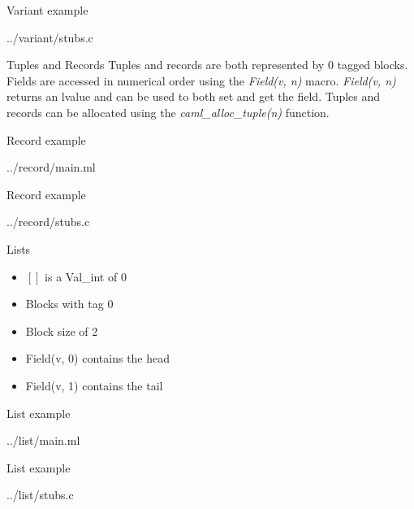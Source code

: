 \documentclass{beamer}
\begin{document}
\begin{frame}[fragile,shrink=20]{Variant example}
\begin{lstinputlisting}[language=ML]{../variant/stubs.c}
\end{lstinputlisting}
\end{frame}

\begin{frame}{Tuples and Records}
Tuples and records are both represented by 0 tagged blocks.  Fields are accessed in numerical order using the
\emph{Field(v, n)} macro.  \emph{Field(v, n)} returns an lvalue and can be used to both set and get the field.
Tuples and records can be allocated using the \emph{caml\_alloc\_tuple(n)} function.
\end{frame}

\begin{frame}[fragile]{Record example}
\begin{lstinputlisting}[language=ML]{../record/main.ml}
\end{lstinputlisting}
\end{frame}

\begin{frame}[fragile]{Record example}
\begin{lstinputlisting}[language=C]{../record/stubs.c}
\end{lstinputlisting}
\end{frame}

\begin{frame}{Lists}
\begin{itemize}
    \item $[]$ is a Val\_int of 0
    \item Blocks with tag 0
    \item Block size of 2
    \item Field(v, 0) contains the head
    \item Field(v, 1) contains the tail
\end{itemize}
\end{frame}

\begin{frame}[fragile]{List example}
\begin{lstinputlisting}[language=ML]{../list/main.ml}
\end{lstinputlisting}
\end{frame}

\begin{frame}[fragile,shrink=5]{List example}
\begin{lstinputlisting}[language=C]{../list/stubs.c}
\end{lstinputlisting}
\end{frame}
\end{document}
